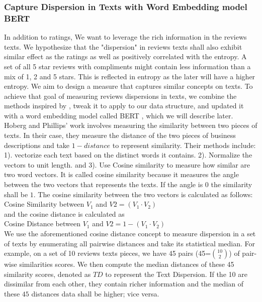 \documentclass[msom,blindrev]{informs3}
\begin{document}
\subsubsection{Capture Dispersion in Texts with Word Embedding model BERT}

In addition to ratings, We want to leverage the rich information in the reviews texts. We hypothesize that the "dispersion" in reviews texts shall also exhibit similar effect as the ratings as well as positively correlated with the entropy. A set of all 5 star reviews with compliments might contain less information than a mix of 1, 2 and 5 stars. This is reflected in entropy as the later will have a higher entropy. We aim to design a measure that captures similar concepts on texts. To achieve that goal of measuring reviews dispersions in texts,  we combine the methods inspired by \cite{hoberg2016text}, tweak it to apply to our data structure,  and updated it with a word embedding model called BERT , which we will describe later. \\
Hoberg and Phillips' work involves measuring the similarity between two pieces of texts. In their case, they measure the distance of the two pieces of business descriptions and take $1 - distance$ to represent similarity. Their methods include: 1). vectorize each text based on the distinct words it contains. 2). Normalize the vectors to unit length. and 3). Use Cosine similarity to measure how similar are two word vectors. It is called cosine similarity because it measures the angle between the two vectors that represents the texts. If the angle is $0$ the similarity shall be $1$. The cosine similarity between the two vectors is calculated as follows: \\
Cosine Similarity between $V_{1}$ and $V{2} =(V_1 \cdot V_2)$\\
and the cosine distance is calculated as \\
Cosine Distance between $V_{1}$ and $V{2}=1-(V_1 \cdot V_2)$\\
We use the aforementioned cosine distance concept to measure dispersion in a set of texts by enumerating all pairwise distances and take its statistical median. For example, on a set of 10 reviews texts pieces, we have 45 pairs (45=$\binom{10}{2}$) of pair-wise similarities scores.  We then compute the median distances of these 45 similarity scores, denoted as $TD$ to represent the Text Dispersion. If the 10 are dissimilar from each other, they contain richer information and the median of these $45$ distances data shall be higher; vice versa.  \\
\end{document}
